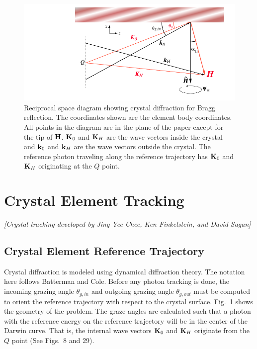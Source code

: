 \begin{figure}[tb]
  \centering
  \includegraphics[width=5in]{crystal-diffraction.pdf}
  \caption[Crystal diffraction diagram.]
{Reciprocal space diagram showing crystal diffraction for Bragg
reflection. The coordinates shown are the element body 
coordinates. All points in the diagram are in the plane of the paper
except for the tip of ${{\bf H}}$.  ${{\bf K}}_{0}$ and ${\bf K}_{H}$ are the wave
vectors inside the crystal and ${\bf k}_{0}$ and ${\bf k}_{H}$ are the
wave vectors outside the crystal. The reference photon traveling along
the reference trajectory has ${{\bf K}}_0$ and ${{\bf K}}_H$ originating at the
$Q$ point.}
  \label{f:crystal.diffraction}
\end{figure}

\section{Crystal Element Tracking}
\label{s:crystal.tracking}

\textit{\large [Crystal tracking developed by Jing Yee Chee, Ken Finkelstein, and David Sagan]}

\subsection{Crystal Element Reference Trajectory}
\label{s:crystal.ref}

Crystal diffraction is modeled using dynamical diffraction theory. The
notation here follows Batterman and Cole\cite{b:batterman}. Before any
photon tracking is done, the incoming grazing angle $\theta_{g,in}$
and outgoing grazing angle $\theta_{g,out}$ must be computed to orient
the reference trajectory with respect to the crystal surface.
Fig.~\ref{f:crystal.diffraction} shows the geometry of the
problem. The graze angles are calculated such that a photon with the
reference energy on the reference trajectory will be in the center of
the Darwin curve. That is, the internal wave vectors ${{\bf K}}_0$ and
${{\bf K}}_H$ originate from the $Q$ point (See \cite{b:batterman} Figs.~8
and 29).

